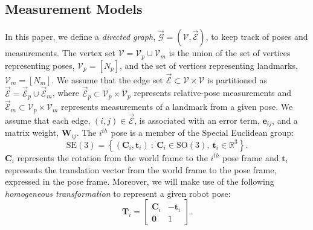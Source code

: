 \documentclass[lettersize,journal]{IEEEtran}
\newcommand{\EdgeSet}{\vec{\bm{\mathcal{E}}}}
\newcommand{\VertSetP}{\bm{\mathcal{V}}_p}
\newcommand{\VertSetM}{\bm{\mathcal{V}}_m}
\newcommand{\VertSet}{\bm{\mathcal{V}}}
\newcommand{\Graph}{\vec{\bm{\mathcal{G}}}}
\begin{document}
\subsection{Measurement Models}

In this paper, we define a \textit{directed graph}, $ \Graph = \left(\VertSet, \EdgeSet\right)$, to keep track of poses  and measurements. The vertex set $ \VertSet = \VertSetP \cup \VertSetM $ is the union of the set of vertices representing poses, $ \VertSetP =\left[N_p\right]$, and the set of vertices representing landmarks, $ \VertSetM = \left[N_m\right]$. We assume that the edge set $\EdgeSet \subset \VertSet \times \VertSet$ is partitioned as $\EdgeSet= \EdgeSet_p \cup \EdgeSet_m$, where $\EdgeSet_p\subset \VertSet_p\times \VertSet_p$ represents relative-pose measurements and $\EdgeSet_m\subset \VertSet_p\times \VertSet_m$ represents measurements of a landmark from a given pose. We assume that each edge, $(i,j)\in \EdgeSet$, is associated with an error term, $\bm{e}_{ij}$, and a matrix weight, $\bm{W}_{ij}$. The $i^{th}$ pose is a member of the Special Euclidean group:
\begin{equation}\label{eqn:pose_var}
	\mbox{SE}(3) = \left\{(\bm{C}_i, \bm{t}_i)~:~\bm{C}_i\in \mbox{SO}(3),~ \bm{t}_i\in \mathbb{R}^3\right\}.
\end{equation}
$\bm{C}_i$ represents the rotation from the world frame to the $i^{th}$ pose frame and $\bm{t}_i$ represents the translation vector from the world frame to the pose frame, expressed in the pose frame. Moreover, we will make use of the following \textit{homogeneous transformation} to represent a given robot pose:
\begin{equation}
	\bm{T}_i = \begin{bmatrix}
		\bm{C}_i & -\bm{t}_i \\ \bm{0} & 1
	\end{bmatrix}.
\end{equation}
\end{document}
